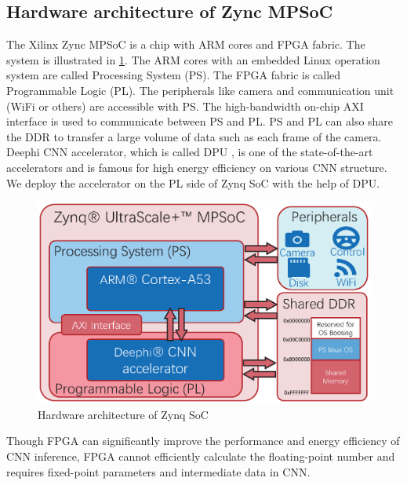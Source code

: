 \subsection{Hardware architecture of Zync MPSoC}
The Xilinx Zync MPSoC is a chip with ARM cores and FPGA fabric. The system is illustrated in \cref{fig:plps}. The ARM cores with an embedded Linux operation system are called Processing System (PS). The FPGA fabric is called Programmable Logic (PL). The peripherals like camera and communication unit (WiFi or others) are accessible with PS. The high-bandwidth on-chip AXI interface is used to communicate between PS and PL. PS and PL can also share the DDR to transfer a large volume of data such as each frame of the camera.
Deephi CNN accelerator, which is called DPU \cite{Tech:2019360}, is one of the state-of-the-art accelerators and is famous for high energy efficiency on various CNN structure. We deploy the accelerator on the PL side of Zynq SoC with the help of DPU.

\begin{figure}[t]  
    \centering  
    \includegraphics[width=0.95\linewidth]{fig/plps.eps}
    \caption{Hardware architecture of Zynq SoC}
    \label{fig:plps}
\end{figure}

Though FPGA can significantly improve the performance and energy efficiency of CNN inference, FPGA cannot efficiently calculate the floating-point number and requires fixed-point parameters and intermediate data in CNN.


